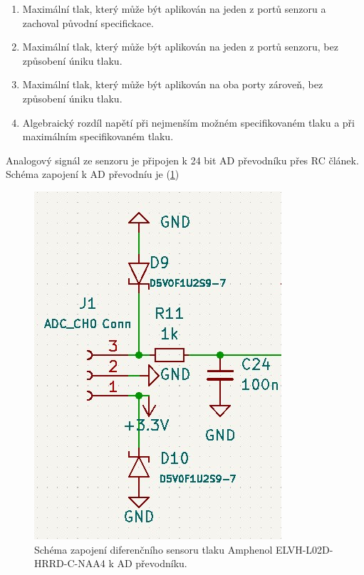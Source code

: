 \begin{table}[H]
\begin{enumerate}
        \item \label{enum:amp_proof_pressure} Maximální tlak, který může být aplikován na jeden z portů senzoru a zachoval původní specifickace.
        \item \label{enum:amp_burst_pressure} Maximální tlak, který může být aplikován na jeden z portů senzoru, bez způsobení úniku tlaku.
        \item \label{enum:amp_common_pressure} Maximální tlak, který může být aplikován na oba porty zároveň, bez způsobení úniku tlaku.
        \item \label{enum:amp_fss} Algebraický rozdíl napětí při nejmenším možném specifikovaném tlaku a při maximálním specifikovaném tlaku.
    \end{enumerate}
\end{table}
\raggedbottom
Analogový signál ze senzoru je připojen k 24 bit AD převodníku přes RC článek. Schéma zapojení k AD převodníu je (\ref{fig:amphenol_circuit})

\begin{figure}[H]
    \centering
    \includegraphics[width=0.7\linewidth]{pictures/diff_sen_circuit.jpg}
    \caption{Schéma zapojení diferenčního sensoru tlaku Amphenol ELVH-L02D-HRRD-C-NAA4 k AD převodníku.}
    \label{fig:amphenol_circuit}
\end{figure}

